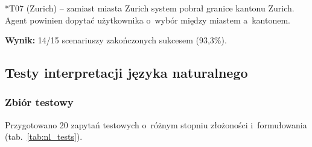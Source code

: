 *T07 (Zurich) -- zamiast miasta Zurich system pobrał granice kantonu Zurich. Agent powinien dopytać użytkownika o~wybór między miastem a~kantonem.

\textbf{Wynik:} 14/15 scenariuszy zakończonych sukcesem (93,3\%).

\subsection{Testy interpretacji języka naturalnego}

\subsubsection{Zbiór testowy}

Przygotowano 20 zapytań testowych o~różnym stopniu złożoności i~formułowania (tab.~\ref{tab:nl_tests}).

